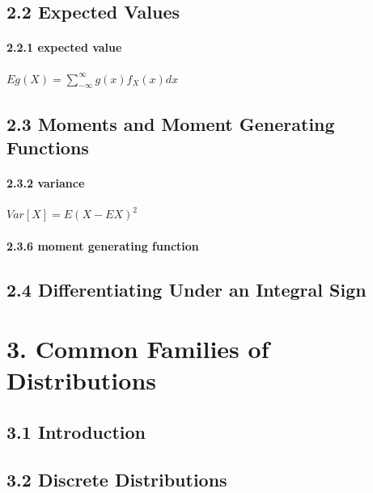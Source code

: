 \documentclass[6pt,twocolumn,Portrait]{article}
\let\oldparagraph\paragraph
\renewcommand{\paragraph}[1]{\oldparagraph{#1}\mbox{}}
\begin{document}
\hypertarget{expected-values}{%
\subsection{2.2 Expected Values}\label{expected-values}}

\hypertarget{mean}{%
\paragraph{2.2.1 expected value}\label{mean}}

\(Eg(X)=\sum_{-\infty}^\infty g(x)f_X(x)dx\)

\hypertarget{moments-and-moment-generating-functions}{%
\subsection{2.3 Moments and Moment Generating
Functions}\label{moments-and-moment-generating-functions}}

\hypertarget{Var}{%
\paragraph{2.3.2 variance}\label{Var}}

\(Var[X]=E(X-EX)^2\)

\hypertarget{MGF}{%
\paragraph{2.3.6 moment generating function}\label{MGF}}

\hypertarget{differentiating-under-an-integral-sign}{%
\subsection{2.4 Differentiating Under an Integral
Sign}\label{differentiating-under-an-integral-sign}}

\hypertarget{common-families-of-distributions}{%
\section{3. Common Families of
Distributions}\label{common-families-of-distributions}}

\hypertarget{introduction}{%
\subsection{3.1 Introduction}\label{introduction}}

\hypertarget{discrete-distributions}{%
\subsection{3.2 Discrete Distributions}\label{discrete-distributions}}
\end{document}
